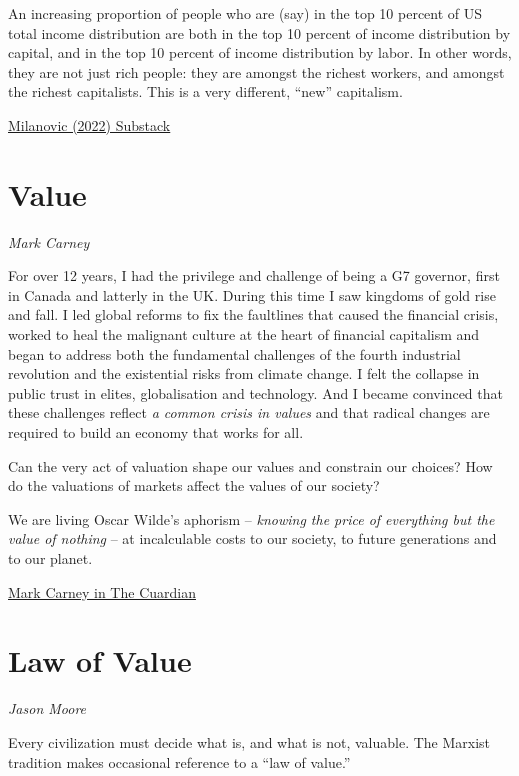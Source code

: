 \documentclass[
]{book}
\begin{document}
An increasing proportion of people who are (say) in the top 10 percent of US total income distribution are both in the top 10 percent of income distribution by capital, and in the top 10 percent of income distribution by labor. In other words, they are not just rich people: they are amongst the richest workers, and amongst the richest capitalists. This is a very different, ``new'' capitalism.

\href{https://branko2f7.substack.com/p/on-import-substitution-fukuyama-eternal}{Milanovic (2022) Substack}

\hypertarget{value}{%
\chapter{Value}\label{value}}

\emph{Mark Carney}

For over 12 years, I had the privilege and challenge of being a G7 governor, first in Canada and latterly in the UK. During this time I saw kingdoms of gold rise and fall. I led global reforms to fix the faultlines that caused the financial crisis, worked to heal the malignant culture at the heart of financial capitalism and began to address both the fundamental challenges of the fourth industrial revolution and the existential risks from climate change. I felt the collapse in public trust in elites, globalisation and technology. And I became convinced that these challenges reflect \emph{a common crisis in values} and that radical changes are required to build an economy that works for all.

Can the very act of valuation shape our values and constrain our choices? How do the valuations of markets affect the values of our society?

We are living Oscar Wilde's aphorism -- \emph{knowing the price of everything but the value of nothing} -- at incalculable costs to our society, to future generations and to our planet.

\href{https://www.theguardian.com/business/2021/mar/13/crisis-in-values-exclusive-extract-mark-carneys-book}{Mark Carney in The Cuardian}

\hypertarget{law-of-value}{%
\chapter{Law of Value}\label{law-of-value}}

\emph{Jason Moore}

Every civilization must decide what is, and what is not, valuable.
The Marxist tradition makes occasional reference to a ``law of
value.''
\end{document}
